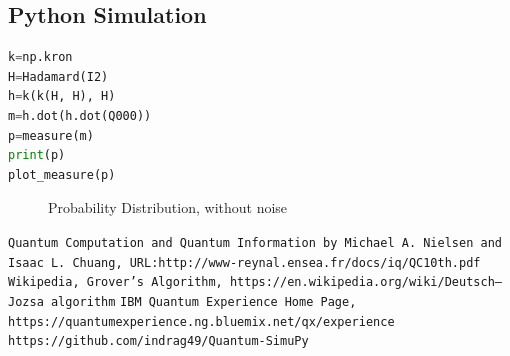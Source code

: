 \documentclass{article}
\begin{document}
\subsection{Python Simulation}
\begin{lstlisting}[language=Python, frame=single]
k=np.kron
H=Hadamard(I2)
h=k(k(H, H), H)
m=h.dot(h.dot(Q000))
p=measure(m)
print(p)
plot_measure(p)
\end{lstlisting}
\begin{figure}[H]
\centering 
\noindent{}%
\caption{Probability Distribution, without noise}
\end{figure}
\begin{thebibliography}{9}
\texttt{Quantum Computation and Quantum Information by Michael A. Nielsen and Isaac L. Chuang, URL:http://www-reynal.ensea.fr/docs/iq/QC10th.pdf}
\texttt{Wikipedia, Grover's Algorithm, https://en.wikipedia.org/wiki/Deutsch–Jozsa algorithm}
\texttt{IBM Quantum Experience Home Page, https://quantumexperience.ng.bluemix.net/qx/experience}
\texttt{https://github.com/indrag49/Quantum-SimuPy}
\end{thebibliography}
\end{document}

